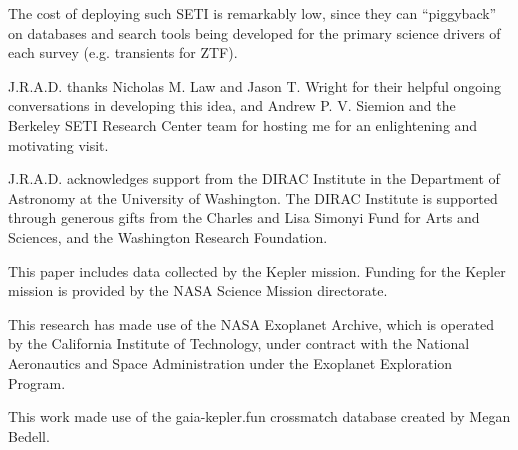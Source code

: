 \documentclass[twocolumn]{aastex62}
\begin{document}
The cost of deploying such SETI is remarkably low, since they can ``piggyback'' on databases and search tools being developed for the primary science drivers of each survey (e.g. transients for ZTF).




\acknowledgments

J.R.A.D. thanks Nicholas M. Law and Jason T. Wright for their helpful ongoing conversations in developing this idea, and Andrew P. V. Siemion and the Berkeley SETI Research Center team for hosting me for an enlightening and motivating visit.

J.R.A.D. acknowledges support from the DIRAC Institute in the Department of Astronomy at the University of Washington. The DIRAC Institute is supported through generous gifts from the Charles and Lisa Simonyi Fund for Arts and Sciences, and the Washington Research Foundation.

This paper includes data collected by the Kepler mission. Funding for the Kepler mission is provided by the NASA Science Mission directorate.

This research has made use of the NASA Exoplanet Archive, which is operated by the California Institute of Technology, under contract with the National Aeronautics and Space Administration under the Exoplanet Exploration Program.

This work made use of the gaia-kepler.fun crossmatch database created by Megan Bedell.


\end{document}
